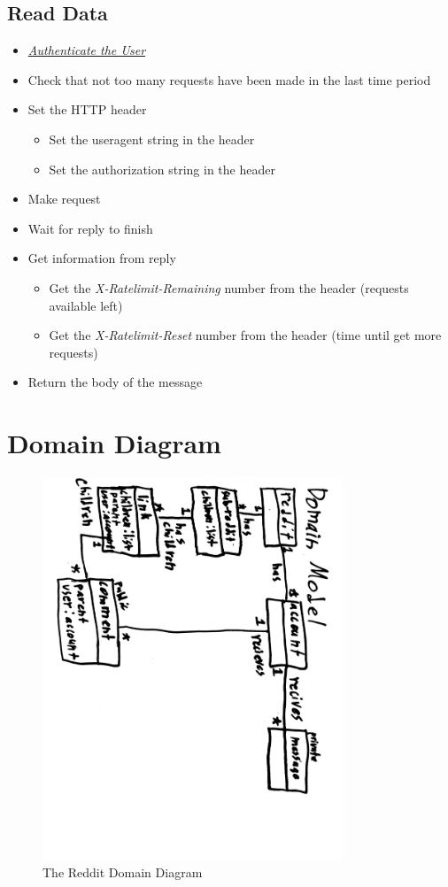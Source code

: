\documentclass[12pt]{article}
\begin{document}
\subsection{Read Data}
\begin{itemize}
	\item \hyperlink{Authenticate the User}{\textit{Authenticate the User}}
	\item Check that not too many requests have been made in the last time period
	\item Set the HTTP header
	\begin{itemize}
		\item Set the useragent string in the header
		\item Set the authorization string in the header
	\end{itemize}
	\item Make request
	\item Wait for reply to finish
	\item Get information from reply
	\begin{itemize}
		\item Get the \textit{X-Ratelimit-Remaining} number from the header (requests available left)
		\item Get the \textit{X-Ratelimit-Reset} number from the header (time until get more requests)
	\end{itemize}
	\item Return the body of the message

\end{itemize}

\newpage
\section{Domain Diagram}
\begin{figure}[ht]
	\centering
	\caption{The Reddit Domain Diagram}
	\label{domain}
	\includegraphics[width=0.8\textwidth]{domain.png}
\end{figure}
\end{document}
